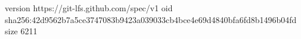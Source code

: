 version https://git-lfs.github.com/spec/v1
oid sha256:42d9562b7a5ce3747083b9423a039033cb4bce4e69d4840bfa6fd8b1496b04fd
size 6211
